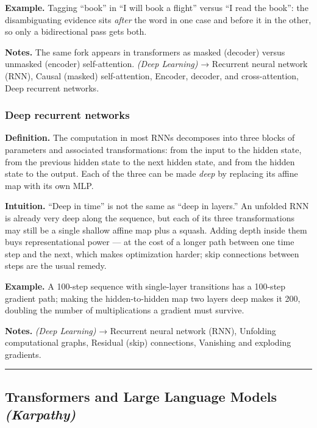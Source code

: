 \documentclass[
  10pt,
  letterpaper,
  onecolumn]{article}
\begin{document}
\textbf{Example.} Tagging ``book'' in ``I will book a flight'' versus
``I read the book'': the disambiguating evidence sits \emph{after} the
word in one case and before it in the other, so only a bidirectional
pass gets both.

\textbf{Notes.} The same fork appears in transformers as masked
(decoder) versus unmasked (encoder) self-attention. \emph{(Deep
Learning)} → Recurrent neural network (RNN), Causal (masked)
self-attention, Encoder, decoder, and cross-attention, Deep recurrent
networks.

\hypertarget{deep-recurrent-networks}{%
\subsubsection{Deep recurrent
networks}\label{deep-recurrent-networks}}

\textbf{Definition.} The computation in most RNNs decomposes into three
blocks of parameters and associated transformations: from the input to
the hidden state, from the previous hidden state to the next hidden
state, and from the hidden state to the output. Each of the three can be
made \emph{deep} by replacing its affine map with its own MLP.

\textbf{Intuition.} ``Deep in time'' is not the same as ``deep in
layers.'' An unfolded RNN is already very deep along the sequence, but
each of its three transformations may still be a single shallow affine
map plus a squash. Adding depth inside them buys representational power
--- at the cost of a longer path between one time step and the next,
which makes optimization harder; skip connections between steps are the
usual remedy.

\textbf{Example.} A 100-step sequence with single-layer transitions has
a 100-step gradient path; making the hidden-to-hidden map two layers
deep makes it 200, doubling the number of multiplications a gradient
must survive.

\textbf{Notes.} \emph{(Deep Learning)} → Recurrent neural network (RNN),
Unfolding computational graphs, Residual (skip) connections, Vanishing
and exploding gradients.

\begin{center}\rule{0.5\linewidth}{0.5pt}\end{center}

\hypertarget{transformers-and-large-language-models-karpathy}{%
\subsection{\texorpdfstring{Transformers and Large Language Models
\emph{(Karpathy)}}{Transformers and Large Language Models (Karpathy)}}\label{transformers-and-large-language-models-karpathy}}
\end{document}
